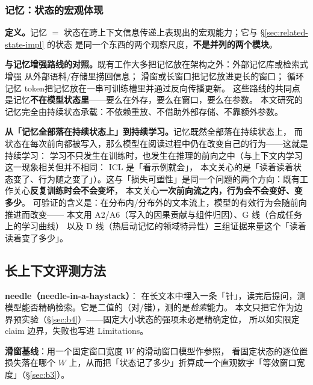 \subsubsection{记忆：状态的宏观体现}\label{sec:related-mem}

\textbf{定义。}记忆 $=$ 状态在跨上下文信息传递上表现出的宏观能力；它与 \S\ref{sec:related-state-impl} 的状态
是同一个东西的两个观察尺度，\textbf{不是并列的两个模块}。

\textbf{与记忆增强路线的对照。}既有工作大多把记忆放在架构之外：外部记忆库或检索式增强
\citep{grave2017improving,lewis2020rag}从外部语料/存储里捞回信息；
滑窗或长窗口\citep{beltagy2020longformer,ding2023longnet}把记忆放进更长的窗口；
循环记忆 token\citep{bulatov2022recurrent}把记忆放在一串可训练槽里并通过反向传播更新。
这些路线的共同点是记忆\textbf{不在模型状态里}——要么在外存，要么在窗口，要么在参数。
本文研究的记忆完全由持续状态承载：不依赖重放、不借助外部存储、不靠额外参数。

\textbf{从「记忆全部落在持续状态上」到持续学习。}记忆既然全部落在持续状态上，
而状态在每次前向都被写入，那么模型在阅读过程中仍在改变自己的行为——这就是持续学习：
学习不只发生在训练时，也发生在推理的前向之中（与上下文内学习这一现象相关但并不相同：
ICL 是「看示例就会」\citep{brown2020gpt3,olsson2022induction,chan2022data}，
本文关心的是「读着读着状态变了、行为随之变了」）。这与「损失可塑性」\citep{dohare2024loss}是同一个问题的两个方向：既有工作关心\textbf{反复训练时会不会变坏}，
本文关心\textbf{一次前向流之内，行为会不会变好、变多少}。
可验证的含义是：在分布内/分布外的文本流上，模型的有效行为会随前向推进而改变——
本文用 A2/A6（写入的因果贡献与组件归因）、G 线（合成任务上的学习曲线）
以及 D 线（热启动记忆的领域特异性）三组证据来量这个「读着读着变了多少」。

\subsection{长上下文评测方法}\label{sec:related-eval}

\textbf{needle（needle-in-a-haystack）}\citep{kamradt2023needle}：
在长文本中埋入一条「针」，读完后提问，测模型能否精确检索。它是二值的（对/错），测的是\emph{检索}能力。
本文只把它作为边界预实验（\S\ref{sec:b4}）——固定大小状态的强项未必是精确定位，
所以如实限定 claim 边界，失败也写进 Limitations。

\textbf{滑窗基线}：用一个固定窗口宽度 $W$ 的滑动窗口模型作参照，
看固定状态的逐位置损失落在哪个 $W$ 上，从而把「状态记了多少」折算成一个直观数字「等效窗口宽度」（\S\ref{sec:b3}）。

